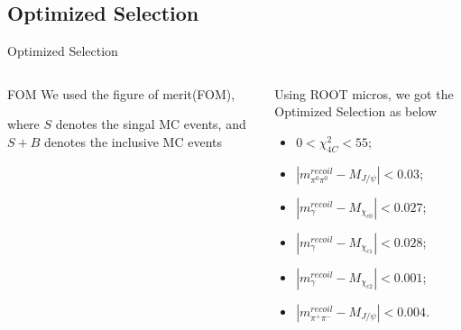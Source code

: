\documentclass{beamer}
\begin{document}
\subsection{Optimized Selection}
\begin{frame}{Optimized Selection}
\begin{columns}
\begin{column}{0.4\textwidth}
\begin{block}{FOM}
We used the figure of merit(FOM), \\
\begin{center}
\end{center}
where $S$ denotes the singal MC events, and $S+B$ denotes the inclusive MC events
\end{block}
\end{column}
\begin{column}{0.5\textwidth}
\begin{block}{Using ROOT micros, we got the Optimized Selection as below}
\begin{itemize}
\item $0<\chi_{4C}^2<55$;
\item $|m^{recoil}_{\pi^0 \pi^0}-M_{J/\psi}|<0.03$;
\item $|m^{recoil}_{\gamma}-M_{\chi_{c0}}|<0.027$;
\item $|m^{recoil}_{\gamma}-M_{\chi_{c1}}|<0.028$;
\item $|m^{recoil}_{\gamma}-M_{\chi_{c2}}|<0.001$;
\item $|m^{recoil}_{\pi^+ \pi^-}-M_{J/\psi}|<0.004$.
\end{itemize}
\end{block}
\end{column}
\end{columns}
\end{frame}
\end{document}
